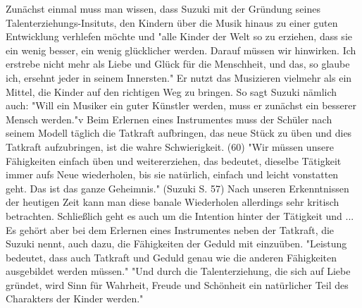 Zunächst einmal muss man wissen, dass Suzuki mit der Gründung seines
Talenterziehungs-Insituts, den Kindern über die Musik hinaus zu einer guten
Entwicklung verhlefen möchte und "alle Kinder der Welt so zu erziehen, dass sie
ein wenig besser, ein wenig glücklicher werden. Darauf müssen wir hinwirken. Ich
erstrebe nicht mehr als Liebe und Glück für die Menschheit, und das, so glaube
ich, ersehnt jeder in seinem Innersten."
\autocite[103]{suzuki:erziehung_ist_liebe}
Er nutzt das Musizieren vielmehr als ein Mittel, die Kinder auf den richtigen
Weg zu bringen. So sagt Suzuki nämlich auch: "Will ein Musiker ein guter
Künstler werden, muss er zunächst ein besserer Mensch
werden."v\autocite[103]{suzuki:erziehung_ist_liebe} Beim Erlernen eines
Instrumentes muss der Schüler nach seinem Modell täglich die Tatkraft
aufbringen, das neue Stück zu üben und dies Tatkraft aufzubringen, ist die wahre
Schwierigkeit. (60) "Wir müssen unsere Fähigkeiten einfach üben und
weitererziehen, das bedeutet, dieselbe Tätigkeit immer aufs Neue wiederholen,
bis sie natürlich, einfach und leicht vonstatten geht. Das ist das ganze
Geheimnis." (Suzuki S. 57) Nach unseren Erkenntnissen der heutigen Zeit kann man
diese banale Wiederholen allerdings sehr kritisch betrachten. Schließlich geht
es auch um die Intention hinter der Tätigkeit und ... Es gehört aber bei dem
Erlernen eines Instrumentes neben der Tatkraft, die Suzuki nennt, auch dazu, die
Fähigkeiten der Geduld mit einzuüben. "Leistung bedeutet, dass auch Tatkraft und
Geduld genau wie die anderen Fähigkeiten ausgebildet werden müssen."
\autocite[60]{suzuki:erziehung_ist_liebe}
"Und durch die Talenterziehung, die sich auf Liebe gründet, wird Sinn für
Wahrheit, Freude und Schönheit ein natürlicher Teil des Charakters der Kinder
werden." \autocite[75]{suzuki:erziehung_ist_liebe}

